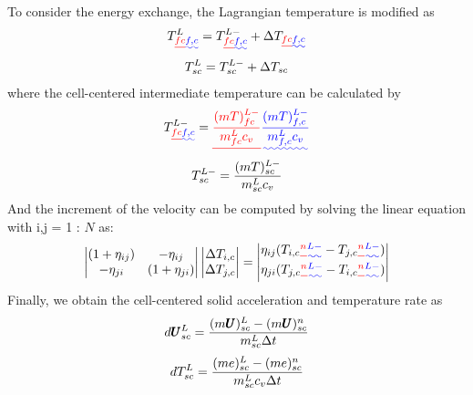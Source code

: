 \documentclass[preprint,12pt]{elsarticle}
\providecommand{\DIFadd}[1]{{\protect\color{blue}\uwave{#1}}} %
\providecommand{\DIFdel}[1]{{\protect\color{red}\sout{#1}}}                      %
\providecommand{\DIFaddbegin}{} %
\providecommand{\DIFaddend}{} %
\providecommand{\DIFdelbegin}{} %
\providecommand{\DIFdelend}{} %
\newcommand{\DIFscaledelfig}{0.5}
\newlength{\DIFdelgraphicswidth} %
\newlength{\DIFdelgraphicsheight} %
\newcommand{\DIFaddincludegraphics}[2][]{{\color{blue}\fbox{\DIFOincludegraphics[#1]{#2}}}} %
\newcommand{\DIFdelincludegraphics}[2][]{%
\sbox{\DIFdelgraphicsbox}{\DIFOincludegraphics[#1]{#2}}%
\settoboxwidth{\DIFdelgraphicswidth}{\DIFdelgraphicsbox} %
\settoboxtotalheight{\DIFdelgraphicsheight}{\DIFdelgraphicsbox} %
\scalebox{\DIFscaledelfig}{%
\parbox[b]{\DIFdelgraphicswidth}{\usebox{\DIFdelgraphicsbox}\\[-\baselineskip] \rule{\DIFdelgraphicswidth}{0em}}\llap{\resizebox{\DIFdelgraphicswidth}{\DIFdelgraphicsheight}{%
\setlength{\unitlength}{\DIFdelgraphicswidth}%
\begin{picture}(1,1)%
\thicklines\linethickness{2pt} %
{\color[rgb]{1,0,0}\put(0,0){\framebox(1,1){}}}%
{\color[rgb]{1,0,0}\put(0,0){\line( 1,1){1}}}%
{\color[rgb]{1,0,0}\put(0,1){\line(1,-1){1}}}%
\end{picture}%
}\hspace*{3pt}}} %
} %
\DeclareRobustCommand{\DIFaddbegin}{\DIFOaddbegin \let\includegraphics\DIFaddincludegraphics} %
\DeclareRobustCommand{\DIFaddend}{\DIFOaddend \let\includegraphics\DIFOincludegraphics} %
\DeclareRobustCommand{\DIFdelbegin}{\DIFOdelbegin \let\includegraphics\DIFdelincludegraphics} %
\DeclareRobustCommand{\DIFdelend}{\DIFOaddend \let\includegraphics\DIFOincludegraphics} %
\begin{document}
%
%
To consider the energy exchange, the Lagrangian temperature  is modified as\DIFaddbegin \DIFadd{:
}\DIFaddend %
\begin{equation}
\begin{gathered}
T_{\DIFdelbegin \DIFdel{fc}\DIFdelend \DIFaddbegin \DIFadd{f,c}\DIFaddend }^{L} = T_{\DIFdelbegin \DIFdel{fc}\DIFdelend \DIFaddbegin \DIFadd{f,c}\DIFaddend }^{L-} + \Delta T_{\DIFdelbegin \DIFdel{fc}\DIFdelend \DIFaddbegin \DIFadd{f,c}\DIFaddend } \\
T_{sc}^{L} = T_{sc}^{L-} + \Delta T_{sc}
\end {gathered}
\end {equation}
%
%
where the cell-centered intermediate temperature can be calculated by\DIFaddbegin \DIFadd{:
}\DIFaddend %
\begin{equation}
\begin{gathered}
T_{\DIFdelbegin \DIFdel{fc}\DIFdelend \DIFaddbegin \DIFadd{f,c}\DIFaddend }^{L-} = \DIFdelbegin \DIFdel{\frac{(m T)_{fc}^{L-}}{m_{fc}^L c_v} }\DIFdelend \DIFaddbegin \DIFadd{\frac{(m T)_{f,c}^{L-}}{m_{f,c}^L c_v} }\DIFaddend \\
T_{sc}^{L-} = \frac{(m T)_{sc}^{L-}}{m_{sc}^L c_v} 
\end {gathered}
\end {equation}
%
%
And the increment of the velocity can be computed by solving the linear equation with i,j = 1 : $N$ as:
%
%
\[ \begin{vmatrix} (1 + \eta_{ij})  &  -\eta_{ij} \\
                  -\eta_{ji}       &  (1 + \eta_{ji})
    \end {vmatrix}
    \begin{vmatrix} \Delta T_{i,c} \\
                    \Delta T_{j,c}
    \end {vmatrix}
    =
    \begin{vmatrix}  \eta_{ij}(T_{i,c}\DIFdelbegin \DIFdel{^{n} }\DIFdelend \DIFaddbegin \DIFadd{^{L-} }\DIFaddend - T_{j,c}\DIFdelbegin \DIFdel{^{n}}\DIFdelend \DIFaddbegin \DIFadd{^{L-}}\DIFaddend ) \\
                    \eta_{ji}(T_{j,c}\DIFdelbegin \DIFdel{^{n} }\DIFdelend \DIFaddbegin \DIFadd{^{L-} }\DIFaddend - T_{i,c}\DIFdelbegin \DIFdel{^{n}}\DIFdelend \DIFaddbegin \DIFadd{^{L-}}\DIFaddend )
    \end {vmatrix}                
\]
%
%
Finally, we obtain the cell-centered solid  acceleration and temperature rate as\DIFaddbegin \DIFadd{:
}\DIFaddend %
%
\begin{equation}
 d\pmb{U}_{sc}^L = \frac{(m \pmb{U})_{sc}^L - (m \pmb{U})_{sc}^n}{m_{sc}^L \Delta{t}}
\end {equation}
%
\begin{equation}
 dT_{sc}^L = \frac{(me)_{sc}^L - (me)_{sc}^n}{m_{sc}^L c_v \Delta{t}}
\end {equation}
%
%
\end{document}
